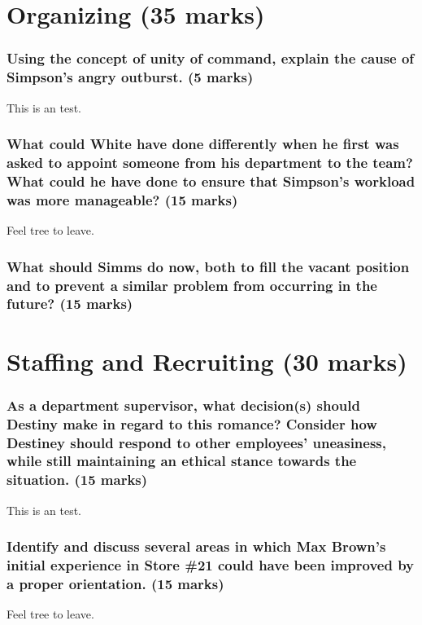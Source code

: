 \documentclass[letterpaper,12pt,titlepage]{article}
\begin{document}
\part{Organizing (35 marks)}

\setcounter{section}{0}

\section{Using the concept of unity of command, explain the cause of Simpson's angry outburst. (5 marks)}

This is an test. 

\section{What could White have done differently when he first was asked to appoint someone from his department to the team? What could he have done to ensure that Simpson's workload was more manageable? (15 marks)}

Feel tree to leave. 

\section{What should Simms do now, both to fill the vacant position and to prevent a similar problem from occurring in the future? (15 marks)}

\part{Staffing and Recruiting (30 marks)}

\setcounter{section}{0}

\section{As a department supervisor, what decision(s) should Destiny make in regard to this romance? Consider how Destiney should respond to other employees' uneasiness, while still maintaining an ethical stance towards the situation. (15 marks)}

This is an test. 

\section{Identify and discuss several areas in which Max Brown's initial experience in Store \#21 could have been improved by a proper orientation. (15 marks)}

Feel tree to leave.
\end{document}
